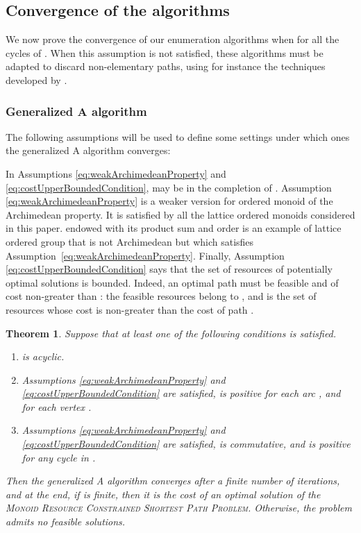 \documentclass[11pt]{amsart}
\theoremstyle{plain}
\newtheorem{theo}{Theorem}
\theoremstyle{remark}
\newcommand{\MRCSP}{\textsc{Monoid Resource Constrained Shortest Path Problem}\xspace}
\begin{document}
\subsection{Convergence of the algorithms} \label{sub:convergence_of_the_algorithms}



We now prove the convergence of our enumeration algorithms when  for all the cycles  of . When this assumption is not satisfied, these algorithms must be adapted to discard non-elementary paths, using for instance the techniques developed by \citet{feillet2004exact}. 

\subsubsection{Generalized A algorithm} \label{ssub:generalized_Astar}
The following assumptions will be used to define some settings under which ones the generalized A algorithm converges:


In Assumptions \eqref{eq:weakArchimedeanProperty} and \eqref{eq:costUpperBoundedCondition},  may be in the completion of . Assumption \eqref{eq:weakArchimedeanProperty} is a weaker version for ordered monoid of the Archimedean property. 
It is satisfied by all the lattice ordered monoids considered in this paper.  endowed with its product sum and order is an example of lattice ordered group that is not Archimedean but which satisfies Assumption~\eqref{eq:weakArchimedeanProperty}. Finally, Assumption \eqref{eq:costUpperBoundedCondition} says that the set of resources of potentially optimal solutions is bounded. Indeed, an optimal path must be feasible and of cost non-greater than : the feasible resources belong to , and  is the set of resources whose cost is non-greater than the cost of path .
\begin{theo}\label{theo:labelSettingConvergence}
Suppose that at least one of the following conditions is satisfied.
\begin{enumerate}\item[(a)]  is acyclic.
 	\item[(b)] Assumptions \eqref{eq:weakArchimedeanProperty} and \eqref{eq:costUpperBoundedCondition} are satisfied,  is positive for each arc , and  for each vertex .
 	\item[(c)] Assumptions \eqref{eq:weakArchimedeanProperty} and \eqref{eq:costUpperBoundedCondition} are satisfied,  is commutative, and  is positive for any cycle  in .
 \end{enumerate}
 \noindent Then the generalized A algorithm converges after a finite number of iterations, and at the end, if   is finite, then it is the cost of an optimal solution of the \MRCSP. Otherwise, the problem admits no feasible solutions. 
\end{theo}
\end{document}
